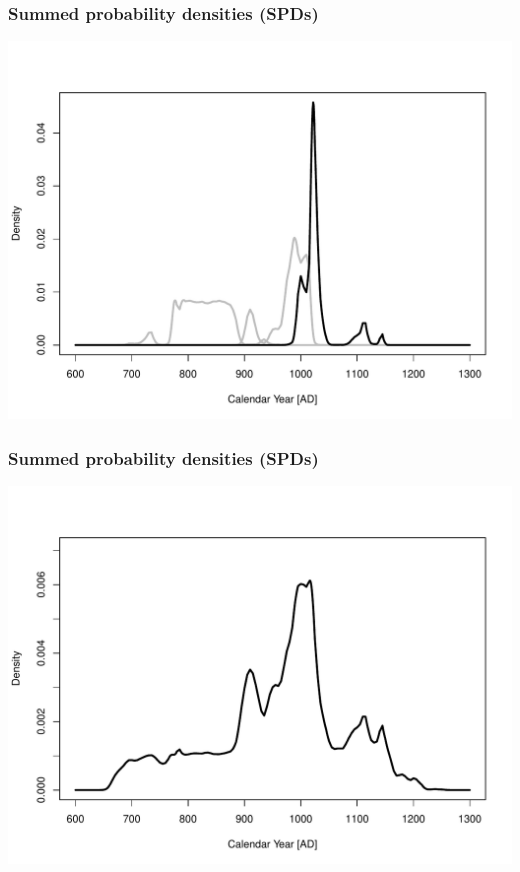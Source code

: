 \documentclass{beamer}
\begin{document}
\begin{frame}[t]
  \frametitle{Summed probability densities (SPDs)}
    \includegraphics[height=.85\textheight]{spd3.pdf}
\end{frame}

\begin{frame}[t]
  \frametitle{Summed probability densities (SPDs)}
    \includegraphics[height=.85\textheight]{spdall.pdf}
\end{frame}
\end{document}
